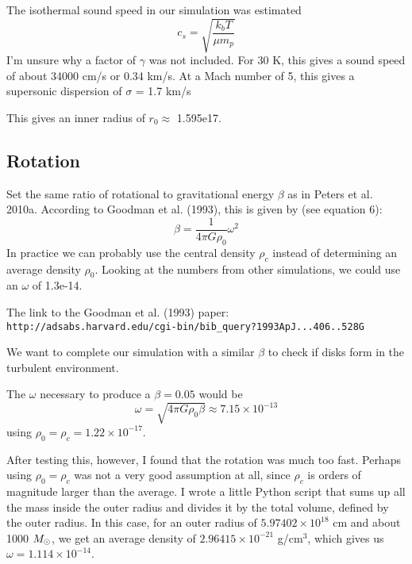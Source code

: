 \documentclass[a4paper]{tufte-handout}
\begin{document}
The isothermal sound speed in our simulation was estimated
\begin{equation}
c_s = \sqrt{\frac{k_b T}{\mu m_p}}
\end{equation}
I'm unsure why a factor of $\gamma$ was not included. For 30 K, this gives a sound speed of about 34000 cm/s or 0.34 km/s. At a Mach number of 5, this gives a supersonic dispersion of $\sigma$ = 1.7 km/s

This gives an inner radius of $r_0 \approx$ 1.595e17. 

\subsection*{Rotation}

Set the same ratio of rotational to gravitational energy $\beta$ as in Peters et al. 2010a. According to Goodman et al. (1993), this is given by (see equation 6):
\begin{equation}
\beta = \frac{1}{4 \pi G \rho_0} \omega^2
\end{equation}
In practice we can probably use the central density $\rho_c$ instead of determining an average density $\rho_0$. Looking at the numbers from other simulations, we could use an $\omega$ of 1.3e-14.

The link to the Goodman et al. (1993) paper:\\
{\tt http://adsabs.harvard.edu/cgi-bin/bib\_query?1993ApJ...406..528G}

We want to complete our simulation with a similar $\beta$ to check if disks form in the turbulent environment.

The $\omega$ necessary to produce a $\beta = 0.05$ would be
\begin{equation}
\omega = \sqrt{4 \pi G \rho_0 \beta} \approx 7.15\times 10^{-13}
\end{equation}
using $\rho_0 = \rho_c = 1.22\times10^{-17}$.

After testing this, however, I found that the rotation was much too fast. Perhaps using $\rho_0 = \rho_c$ was not a very good assumption at all, since $\rho_c$ is orders of magnitude larger than the average. I wrote a little Python script that sums up all the mass inside the outer radius and divides it by the total volume, defined by the outer radius. In this case, for an outer radius of $5.97402\times 10^{18}$ cm and about 1000 $M_\odot$, we get an average density of $2.96415\times 10^{-21}$ g/cm$^3$, which gives us $\omega = 1.114 \times 10^{-14}$.





\end{document}
